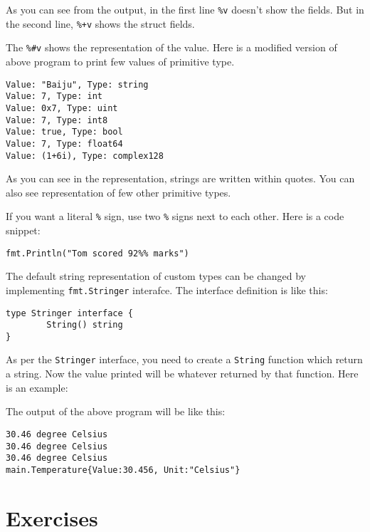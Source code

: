 As you can see from the output, in the first line \texttt{\%v} doesn't
show the fields.  But in the second line, \texttt{\%+v} shows the
struct fields.

The \texttt{\%\#v} shows the representation of the value. Here is a
modified version of above program to print few values of primitive
type.



\begin{lstlisting}[numbers=none]
Value: "Baiju", Type: string
Value: 7, Type: int
Value: 0x7, Type: uint
Value: 7, Type: int8
Value: true, Type: bool
Value: 7, Type: float64
Value: (1+6i), Type: complex128
\end{lstlisting}

As you can see in the representation, strings are written within
quotes.  You can also see representation of few other primitive types.

If you want a literal \texttt{\%} sign, use two \texttt{\%} signs next
to each other.  Here is a code snippet:

\begin{lstlisting}[numbers=none]
        fmt.Println("Tom scored 92%% marks")
\end{lstlisting}

The default string representation of custom types can be changed by
implementing \texttt{fmt.Stringer} interafce.  The interface
definition is like this:

\begin{lstlisting}[numbers=none]
type Stringer interface {
        String() string
}
\end{lstlisting}

As per the \texttt{Stringer} interface, you need to create
a \texttt{String} function which return a string.  Now the value
printed will be whatever returned by that function.  Here is an
example:



The output of the above program will be like this:

\begin{lstlisting}[numbers=none]
30.46 degree Celsius
30.46 degree Celsius
30.46 degree Celsius
main.Temperature{Value:30.456, Unit:"Celsius"}
\end{lstlisting}

\section{Exercises}

